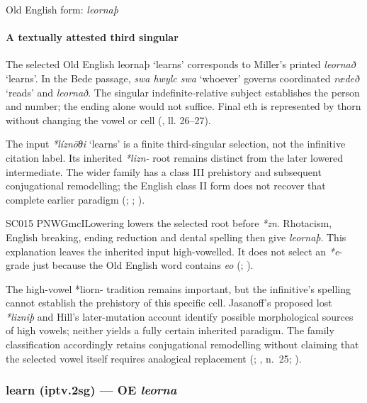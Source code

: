 \documentclass[
  british,
  a4paper,
]{article}
\providecommand{\Recon}[1]{\emph{*#1}}
\begin{document}
Old English form: \emph{leornaþ}

\paragraph{A textually attested third
singular}\label{a-textually-attested-third-singular}

The selected Old English {leornaþ} `learns' corresponds to Miller's
printed \emph{leornað} `learns'. In the Bede passage, \emph{swa hwylc
swa} `whoever' governs coordinated \emph{rædeð} `reads' and
\emph{leornað}. The singular indefinite-relative subject establishes the
person and number; the ending alone would not suffice. Final eth is
represented by thorn without changing the vowel or cell
(, ll. 26--27).

The input \Recon{líznōθi} `learns' is a finite third-singular selection,
not the infinitive citation label. Its inherited \emph{*lizn-} root
remains distinct from the later lowered intermediate. The wider family
has a class III prehistory and subsequent conjugational remodelling; the
English class II form does not recover that complete earlier paradigm
(;
;
).

SC015 PNWGmcILowering lowers the selected root before \emph{*zn}.
Rhotacism, English breaking, ending reduction and dental spelling then
give \emph{leornaþ}. This explanation leaves the inherited input
high-vowelled. It does not select an \emph{*e}-grade just because the
Old English word contains \emph{eo} (; ).

The high-vowel *liorn- tradition remains important, but the infinitive's
spelling cannot establish the prehistory of this specific cell.
Jasanoff's proposed lost \emph{*lizniþ} and Hill's later-mutation
account identify possible morphological sources of high vowels; neither
yields a fully certain inherited paradigm. The family classification
accordingly retains conjugational remodelling without claiming that the
selected vowel itself requires analogical replacement
(;
, n.~25;
).

\subsubsection{\texorpdfstring{learn (iptv.2sg) --- OE
\emph{leorna}}{learn (iptv.2sg) --- OE leorna}}\label{learn-iptv.2sg-oe-leorna}
\end{document}
